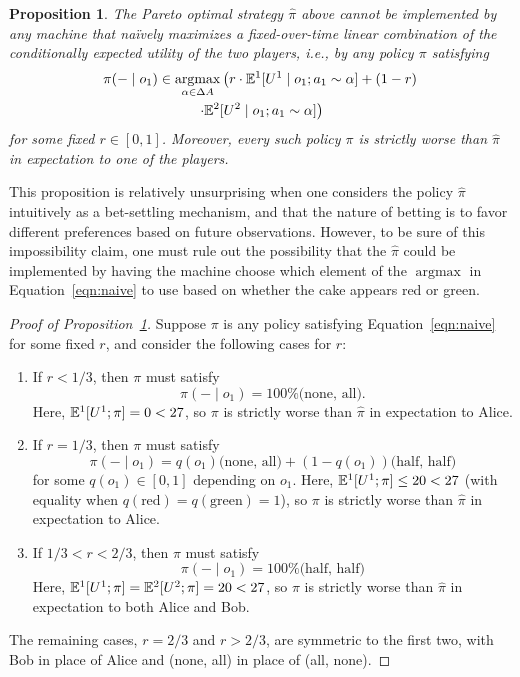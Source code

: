 \documentclass{article}
\newcommand{\eqn}[1]{Equation~\ref{eqn:#1}}
\newcommand{\prop}[1]{Proposition~\ref{prop:#1}}
\DeclareMathOperator*{\argmax}{argmax}
\newtheorem{proposition}[theorem]{Proposition}
\begin{document}
\begin{proposition}\label{prop:impossibility}
The Pareto optimal strategy $\hat\pi$ above cannot be implemented by any machine that na\"{i}vely maximizes a fixed-over-time linear combination of the conditionally expected utility of the two players, i.e., by any policy $\pi$ satisfying 
%
\begin{multline}\label{eqn:naive}
\pi(- \mid o_1) \in \argmax_{\alpha\in\Delta A}\left(r\cdot\EE^1[U^1 \mid o_1; a_1\sim\alpha] + (1-r)\right. \\ 
\left. \cdot\EE^2[U^2 \mid o_1; a_1\sim\alpha]\right)
\end{multline}
%
for some fixed $r\in[0,1]$.  Moreover, every such policy $\pi$ is strictly worse than $\hat\pi$ in expectation to one of the players.
\end{proposition} 

This proposition is relatively unsurprising when one considers the policy $\hat\pi$ intuitively as a bet-settling mechanism, and that the nature of betting is to favor different preferences based on future observations.  However, to be sure of this impossibility claim, one must rule out the possibility that the $\hat\pi$ could be implemented by having the machine choose which element of the $\argmax$ in \eqn{naive} to use based on whether the cake appears red or green.  

\begin{proof}[Proof of \prop{impossibility}] Suppose $\pi$ is any policy satisfying \eqn{naive} for some fixed $r$, and consider the following cases for $r$:
\begin{enumerate}
\item If $r < 1/3 $, then $\pi$ must satisfy
\[
\pi(-\mid o_1) = 100\%\text{(none, all)}.
\] 
Here, $\mathbb{E}^1[U^1 ; \pi] = 0 < 27$, so $\pi$ is strictly worse than $\hat\pi$ in expectation to Alice.

\item If $r = 1/3 $, then $\pi$ must satisfy
\[
\pi(-\mid o_1) = q(o_1)\text{(none, all)} + (1-q(o_1))\text{(half, half)}
\] 
for some $q(o_1)\in[0,1]$ depending on $o_1$.  Here, $\mathbb{E}^1[U^1 ; \pi] \le 20 < 27$ (with equality when $q(\text{red})=q(\text{green})=1$), so $\pi$ is strictly worse than $\hat\pi$ in expectation to Alice.

\item If $1/3 < r < 2/3 $, then $\pi$ must satisfy
\[
\pi(-\mid o_1)=100\%\text{(half, half)}
\]
Here, $\mathbb{E}^1[U^1 ; \pi] = \mathbb{E}^2[U^2 ; \pi] = 20 < 27$, so $\pi$ is strictly worse than $\hat\pi$ in expectation to both Alice and Bob.
\end{enumerate}
The remaining cases, $r=2/3$ and  $r>2/3$, are symmetric to the first two, with Bob in place of Alice and (none, all) in place of (all, none).
\end{proof}
\end{document}
